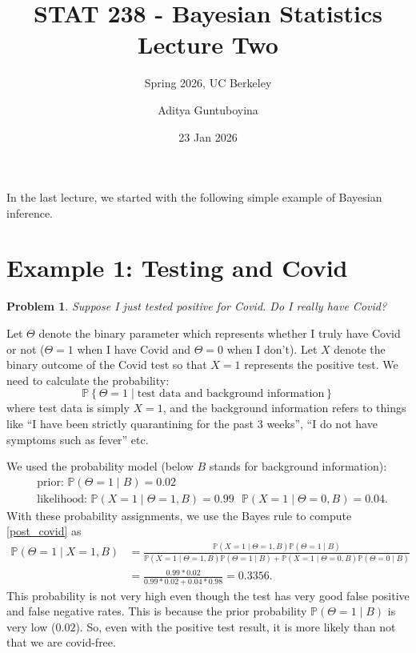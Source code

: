 \documentclass{scrartcl}
\newtheorem{problem}[theorem]{Problem}
\renewcommand{\P}{{\mathbb P}}
\begin{document}
\title{STAT 238 - Bayesian Statistics  \\
  Lecture Two} 
\subtitle{Spring 2026, UC Berkeley}

\author{Aditya Guntuboyina}


\date{23 Jan 2026}

\maketitle

In the last lecture, we started with the following simple example of
Bayesian inference.

\section{Example 1: Testing and Covid}
\begin{problem}
  Suppose I just tested positive for Covid. Do I really have Covid?
\end{problem}


Let $\Theta$ denote the binary parameter which represents whether I
truly have Covid or not ($\Theta = 1$ when I have Covid and $\Theta =
0$ when I don't). Let $X$ denote the binary outcome of the Covid test
so that $X = 1$ represents the positive test. We need to calculate the
probability:
\begin{equation}\label{post_covid}
  \P \left\{\Theta = 1 \mid \text{test data} \text{ and } \text{background
      information} \right\} 
\end{equation}
where test data is simply $X = 1$, and the background information
refers to things like ``I have been strictly
quarantining for the past 3 weeks'', ``I do not have symptoms such as
fever'' etc.

We used the probability model (below $B$ stands for background
information): 
\begin{equation*}
  \begin{split}
&  \text{prior: }  \P(\Theta = 1 \mid B) = 0.02  \\
& \text{likelihood: } \P(X = 1\mid \Theta = 1, B) = 0.99 ~~~
    \P(X = 1 \mid \Theta = 0, B) = 0.04.
  \end{split}  
\end{equation*}
With these probability assignments, we use the Bayes rule to compute 
\eqref{post_covid} as
\begin{align*}
  \P(\Theta = 1 \mid X = 1, B) &= \frac{\P(X  = 1 
                    \mid \Theta = 1, B) \P(\Theta = 1 \mid B)}{\P(X = 1
                    \mid \Theta = 1, B) \P(\Theta = 1 \mid B) + \P(X = 1
                                 \mid \Theta = 0, B) \P(\Theta = 0 \mid B)} \\
  &= \frac{0.99 *
      0.02}{0.99 * 0.02 + 0.04*0.98} = 0.3356. 
\end{align*}
This probability is not very high even though the test has very good
false positive and false negative 
  rates. This is because the prior probability $\P(\Theta = 1 \mid B)$
  is very low   ($0.02$). So, even with the positive test result, it
  is more likely than not that we are covid-free.
\end{document}
